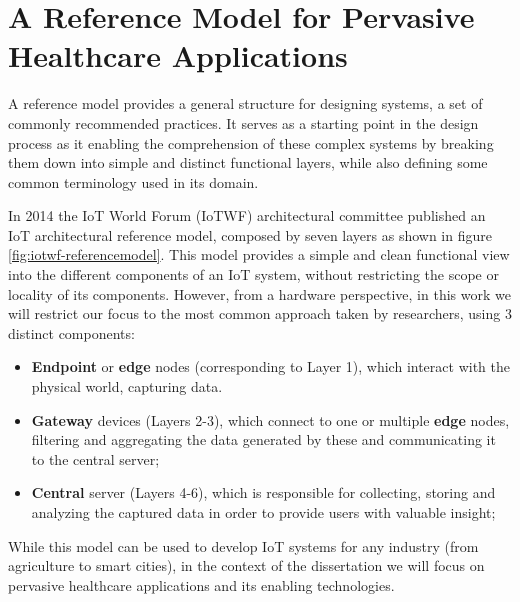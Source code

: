 
\section{A Reference Model for Pervasive Healthcare Applications}

A reference model provides a general structure for designing systems, a set of commonly recommended practices. It serves as a starting point in the design process as it enabling the comprehension of these complex systems by breaking them down into simple and distinct functional layers, while also defining some common terminology used in its domain. \bigskip

In 2014 the \acs{IoT} World Forum (IoTWF) architectural committee published an \acs{IoT} architectural reference model, composed by seven layers as shown in figure \ref{fig:iotwf-referencemodel}. This model provides a simple and clean functional view into the different components of an \acs{IoT} system, without restricting the scope or locality of its components. However, from a hardware perspective, in this work we will restrict our focus to the most common approach taken by researchers, using 3 distinct components: 

\begin{itemize}
    \item \textbf{Endpoint} or \textbf{edge} nodes (corresponding to Layer 1), which interact with the physical world, capturing data.
    \item \textbf{Gateway} devices (Layers 2-3), which connect to one or multiple \textbf{edge} nodes, filtering and aggregating the data generated by these and communicating it to the central server; 
    \item \textbf{Central} server (Layers 4-6), which is responsible for collecting, storing and analyzing the captured data in order to provide users with valuable insight;
\end{itemize}

While this model can be used to develop IoT systems for any industry (from agriculture to smart cities), in the context of the dissertation we will focus on pervasive healthcare applications and its enabling technologies. \bigskip


